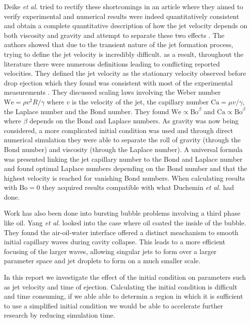 Deike \textit{et al.} tried to rectify these shortcomings in an article where they aimed to verify experimental and numerical results were indeed quantitatively consistent and obtain a complete quantitative description of how the jet velocity depends on both viscosity and gravity and attempt to separate these two effects \cite{deike2018dynamics}. The authors showed that due to the transient nature of the jet formation process, trying to define the jet velocity is incredibly difficult. as a result, throughout the literature there were numerous definitions leading to conflicting reported velocities. They defined the jet velocity as the stationary velocity observed before drop ejection which they found was consistent with most of the experimental measurements \cite{spiel1995births}. They discussed scaling laws involving the Weber number $\text{We}=\rho v^2R/\gamma$ where $v$ is the velocity of the jet, the capillary number $\text{Ca}=\mu v/\gamma$, the Laplace number and the Bond number. They found $\text{We} \propto \text{Bo}^{\beta}$ and $\text{Ca} \propto \text{Bo}^{\beta}$ where $\beta$ depends on the Bond and Laplace numbers. As gravity was now being considered, a more complicated initial condition was used and through direct numerical simulation they were able to separate the roll of gravity (through the Bond number) and viscosity (through the Laplace number). A universal formula was presented linking the jet capillary number to the Bond and Laplace number and found optimal Laplace numbers depending on the Bond number and that the highest velocity is reached for vanishing Bond numbers. When calculating results with $\text{Bo}=0$ they acquired results compatible with what Duchemin \textit{et al.} had done.

Work has also been done into bursting bubble problems involving a third phase like oil. Yang \textit{et al.} \cite{yang2023enhanced} looked into the case where oil coated the inside of the bubble. They found the air-oil-water interface offered a distinct meachanism to smooth initial capillary waves during cavity collapse. This leads to a more efficient focusing of the larger waves, allowing singular jets to form over a larger parameter space and jet droplets to form on a much smaller scale.

In this report we investigate the effect of the initial condition on parameters such as jet velocity and time of ejection. Calculating the initial condition is difficult and time consuming, if we able able to determin a region in which it is sufficient to use a simplified initial condition we would be able to accelerate further research by reducing simulation time.

